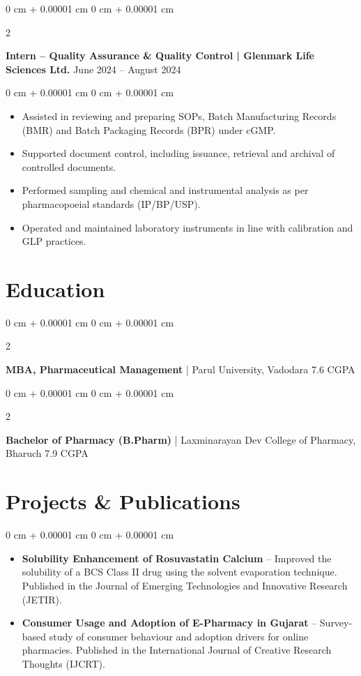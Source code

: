 \documentclass[10pt, letterpaper]{article}
\newenvironment{highlights}{
    \begin{itemize}[
        topsep=0.10 cm,
        parsep=0.10 cm,
        partopsep=0pt,
        itemsep=0pt,
        leftmargin=0 cm + 10pt
    ]
}{
    \end{itemize}
} %
\newenvironment{onecolentry}{
    \begin{adjustwidth}{
        0 cm + 0.00001 cm
    }{
        0 cm + 0.00001 cm
    }
}{
    \end{adjustwidth}
} %
\newenvironment{twocolentry}[2][]{
    \onecolentry
    \def\secondColumn{#2}
    \setcolumnwidth{\fill, 4.5 cm}
    \begin{paracol}{2}
}{
    \switchcolumn \raggedleft \secondColumn
    \end{paracol}
    \endonecolentry
} %
\begin{document}
        \begin{twocolentry}{
            June 2024 -- August 2024
        }
            \textbf{Intern -- Quality Assurance \& Quality Control | Glenmark Life Sciences Ltd.}\end{twocolentry}
        \vspace{0.10 cm}
        \begin{onecolentry}
            \begin{highlights}
                \item Assisted in reviewing and preparing SOPs, Batch Manufacturing Records (BMR) and Batch Packaging Records (BPR) under cGMP.
                \item Supported document control, including issuance, retrieval and archival of controlled documents.
                \item Performed sampling and chemical and instrumental analysis as per pharmacopoeial standards (IP/BP/USP).
                \item Operated and maintained laboratory instruments in line with calibration and GLP practices.
            \end{highlights}
        \end{onecolentry}

    \section{Education}
        \begin{twocolentry}{
            [Year] \textbullet{} 7.6 CGPA
        }
            \textbf{MBA, Pharmaceutical Management} | Parul University, Vadodara\end{twocolentry}
        \vspace{0.10 cm}
        \begin{twocolentry}{
            [Year] \textbullet{} 7.9 CGPA
        }
            \textbf{Bachelor of Pharmacy (B.Pharm)} | Laxminarayan Dev College of Pharmacy, Bharuch\end{twocolentry}

    \section{Projects \& Publications}
        \begin{onecolentry}
            \begin{highlights}
                \item \textbf{Solubility Enhancement of Rosuvastatin Calcium} -- Improved the solubility of a BCS Class II drug using the solvent evaporation technique. Published in the Journal of Emerging Technologies and Innovative Research (JETIR).
                \item \textbf{Consumer Usage and Adoption of E-Pharmacy in Gujarat} -- Survey-based study of consumer behaviour and adoption drivers for online pharmacies. Published in the International Journal of Creative Research Thoughts (IJCRT).
            \end{highlights}
        \end{onecolentry}
\end{document}
